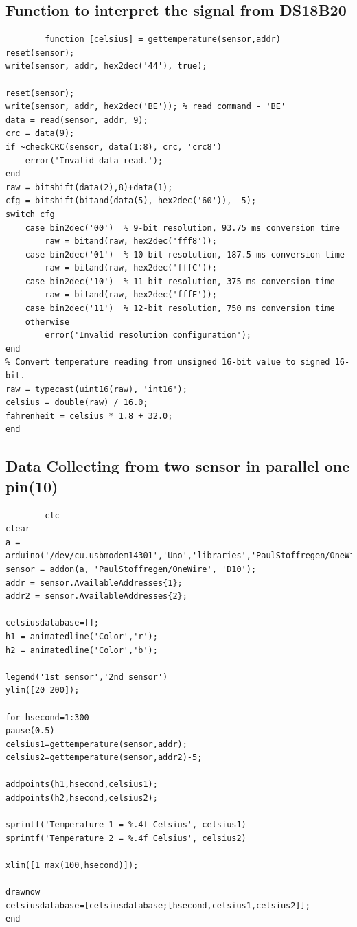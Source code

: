 \documentclass[12pt]{article}
\numberwithin{equation}{section}
\begin{document}
      \subsection{Function to interpret the signal from DS18B20}
      \begin{lstlisting}
      	function [celsius] = gettemperature(sensor,addr)
reset(sensor);
write(sensor, addr, hex2dec('44'), true);

reset(sensor);
write(sensor, addr, hex2dec('BE')); % read command - 'BE'
data = read(sensor, addr, 9);
crc = data(9);
if ~checkCRC(sensor, data(1:8), crc, 'crc8')
    error('Invalid data read.');
end
raw = bitshift(data(2),8)+data(1);
cfg = bitshift(bitand(data(5), hex2dec('60')), -5);
switch cfg
    case bin2dec('00')  % 9-bit resolution, 93.75 ms conversion time
        raw = bitand(raw, hex2dec('fff8'));
    case bin2dec('01')  % 10-bit resolution, 187.5 ms conversion time
        raw = bitand(raw, hex2dec('fffC'));
    case bin2dec('10')  % 11-bit resolution, 375 ms conversion time
        raw = bitand(raw, hex2dec('fffE'));
    case bin2dec('11')  % 12-bit resolution, 750 ms conversion time
    otherwise
        error('Invalid resolution configuration');
end
% Convert temperature reading from unsigned 16-bit value to signed 16-bit.
raw = typecast(uint16(raw), 'int16');
celsius = double(raw) / 16.0;
fahrenheit = celsius * 1.8 + 32.0;
end

      \end{lstlisting} 
      \subsection{Data Collecting from two sensor in parallel one pin(10)}
\begin{lstlisting}
      	clc
clear
a = arduino('/dev/cu.usbmodem14301','Uno','libraries','PaulStoffregen/OneWire');
sensor = addon(a, 'PaulStoffregen/OneWire', 'D10');
addr = sensor.AvailableAddresses{1};
addr2 = sensor.AvailableAddresses{2};

celsiusdatabase=[];
h1 = animatedline('Color','r');
h2 = animatedline('Color','b');

legend('1st sensor','2nd sensor')
ylim([20 200]);

for hsecond=1:300
pause(0.5)
celsius1=gettemperature(sensor,addr);
celsius2=gettemperature(sensor,addr2)-5;

addpoints(h1,hsecond,celsius1);
addpoints(h2,hsecond,celsius2);

sprintf('Temperature 1 = %.4f Celsius', celsius1)
sprintf('Temperature 2 = %.4f Celsius', celsius2)

xlim([1 max(100,hsecond)]);

drawnow
celsiusdatabase=[celsiusdatabase;[hsecond,celsius1,celsius2]];
end
\end{lstlisting}
\end{document}
